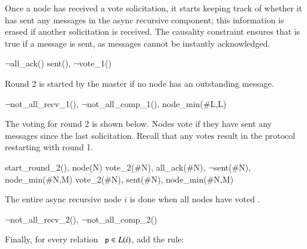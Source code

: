 \noindent Once a node has received a  vote solicitation, it starts keeping track of whether it has sent any messages in the async recursive component; this information is erased if another  solicitation is received.  The causality constraint ensures that  is true if a message is sent, as messages cannot be instantly acknowledged.

\begin{Drules}
      {$\lnot$all_ack()}
      {sent(), $\lnot$vote_1()}
\end{Drules}

\noindent Round 2 is started by the master if no node has an outstanding message.

\begin{Drules}
      {$\lnot$not_all_recv_1(), $\lnot$not_all_comp_1(), node_min(#L,L)}
\end{Drules}

\noindent The voting for round 2 is shown below.  Nodes vote  if they have sent any messages since the last  solicitation.  Recall that any  votes result in the protocol restarting with round 1.

\begin{Drules}
      {start_round_2(), node(N)}
      {vote_2(#N), all_ack(#N), $\lnot$sent(#N), node_min(#N,M)}
      {vote_2(#N), sent(#N), node_min(#N,M)}
\end{Drules}

\noindent The entire async recursive node $i$ is done when all nodes have voted .

\begin{Drules}
      {$\lnot$not_all_recv_2(), $\lnot$not_all_comp_2()}
\end{Drules}

\noindent Finally, for every relation $\dedalus{p} \in L(i)$, add the rule: 

